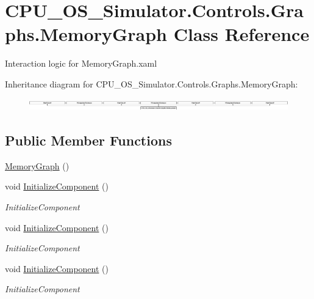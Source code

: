\hypertarget{class_c_p_u___o_s___simulator_1_1_controls_1_1_graphs_1_1_memory_graph}{}\section{C\+P\+U\+\_\+\+O\+S\+\_\+\+Simulator.\+Controls.\+Graphs.\+Memory\+Graph Class Reference}
\label{class_c_p_u___o_s___simulator_1_1_controls_1_1_graphs_1_1_memory_graph}


Interaction logic for Memory\+Graph.\+xaml  


Inheritance diagram for C\+P\+U\+\_\+\+O\+S\+\_\+\+Simulator.\+Controls.\+Graphs.\+Memory\+Graph\+:\begin{figure}[H]
\begin{center}
\leavevmode
\includegraphics[height=0.516129cm]{class_c_p_u___o_s___simulator_1_1_controls_1_1_graphs_1_1_memory_graph}
\end{center}
\end{figure}
\subsection*{Public Member Functions}
\begin{DoxyCompactItemize}
\item 
\hyperlink{class_c_p_u___o_s___simulator_1_1_controls_1_1_graphs_1_1_memory_graph_ac5c79c29c215a897c7446df47519d238}{Memory\+Graph} ()
\item 
void \hyperlink{class_c_p_u___o_s___simulator_1_1_controls_1_1_graphs_1_1_memory_graph_a5a5ad5059554eb0f53a7a6b4fd0a2932}{Initialize\+Component} ()
\begin{DoxyCompactList}\small\item\em Initialize\+Component \end{DoxyCompactList}\item 
void \hyperlink{class_c_p_u___o_s___simulator_1_1_controls_1_1_graphs_1_1_memory_graph_a5a5ad5059554eb0f53a7a6b4fd0a2932}{Initialize\+Component} ()
\begin{DoxyCompactList}\small\item\em Initialize\+Component \end{DoxyCompactList}\item 
void \hyperlink{class_c_p_u___o_s___simulator_1_1_controls_1_1_graphs_1_1_memory_graph_a5a5ad5059554eb0f53a7a6b4fd0a2932}{Initialize\+Component} ()
\begin{DoxyCompactList}\small\item\em Initialize\+Component \end{DoxyCompactList}\end{DoxyCompactItemize}
